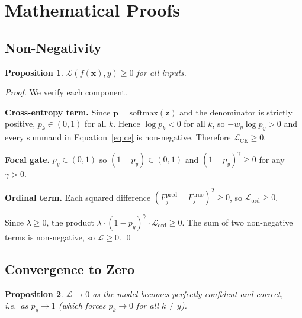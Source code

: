 \documentclass[12pt, a4paper]{article}
\newtheorem{proposition}{Proposition}
\theoremstyle{definition}
\theoremstyle{remark}
\begin{document}
\section{Mathematical Proofs}

\subsection{Non-Negativity}

\begin{proposition}
$\mathcal{L}(f(\mathbf{x}), y) \geq 0$ for all inputs.
\end{proposition}

\begin{proof}
We verify each component.

\textbf{Cross-entropy term.}  Since $\mathbf{p} = \mathrm{softmax}(\mathbf{z})$
and the denominator is strictly positive, $p_k \in (0,1)$ for all $k$.
Hence $\log p_k < 0$ for all $k$, so $-w_y \log p_y > 0$ and every
summand in Equation~\eqref{eq:ce} is non-negative.
Therefore $\mathcal{L}_{\mathrm{CE}} \geq 0$.

\textbf{Focal gate.}  $p_y \in (0,1)$ so $(1-p_y) \in (0,1)$ and $(1-p_y)^{\gamma} \geq 0$
for any $\gamma > 0$.

\textbf{Ordinal term.}  Each squared difference
$(F_j^{\mathrm{pred}} - F_j^{\mathrm{true}})^2 \geq 0$,
so $\mathcal{L}_{\mathrm{ord}} \geq 0$.

Since $\lambda \geq 0$, the product $\lambda \cdot (1-p_y)^{\gamma} \cdot \mathcal{L}_{\mathrm{ord}} \geq 0$.
The sum of two non-negative terms is non-negative, so $\mathcal{L} \geq 0$. \qed
\end{proof}

\subsection{Convergence to Zero}

\begin{proposition}
$\mathcal{L} \to 0$ as the model becomes perfectly confident and correct,
i.e.\ as $p_y \to 1$ (which forces $p_k \to 0$ for all $k \neq y$).
\end{proposition}
\end{document}
